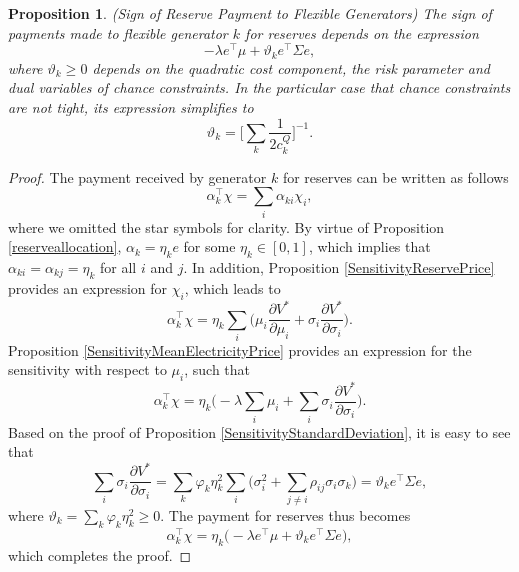 \documentclass{article}
\newtheorem{proposition}{Proposition}
\begin{document}
\begin{proposition}
(Sign of Reserve Payment to Flexible Generators) The sign of payments made to flexible generator $k$ for reserves depends on the expression
\begin{equation*}
-\lambda e^\top \mu + \vartheta_k e^\top \Sigma e,
\end{equation*}
where $\vartheta_k \ge 0$ depends on the quadratic cost component, the risk parameter and dual variables of chance constraints. In the particular case that chance constraints are not tight, its expression simplifies to
\begin{equation*}
\vartheta_k = \bigg[\sum_k \frac{1}{2 c_k^Q} \bigg]^{-1}.
\end{equation*} 
\end{proposition}
\begin{proof}
The payment received by generator $k$ for reserves can be written as follows
\begin{equation*}
\alpha_k^\top \chi = \sum_i \alpha_{ki} \chi_i,
\end{equation*}
where we omitted the star symbols for clarity. By virtue of Proposition \ref{reserveallocation}, $\alpha_k = \eta_k e$ for some $\eta_k \in [0, 1]$, which implies that $\alpha_{ki} = \alpha_{kj} = \eta_k$ for all $i$ and $j$. In addition, Proposition \ref{SensitivityReservePrice} provides an expression for $\chi_i$, which leads to
\begin{equation*}
\alpha_k^\top \chi = \eta_k \sum_i \bigg(\mu_i \frac{\partial V^*}{\partial \mu_i} + \sigma_i \frac{\partial V^*}{\partial \sigma_i}\bigg).
\end{equation*}
Proposition \ref{SensitivityMeanElectricityPrice} provides an expression for the sensitivity with respect to $\mu_i$, such that
\begin{equation*}
\alpha_k^\top \chi = \eta_k \bigg(-\lambda \sum_i \mu_i + \sum_i \sigma_i \frac{\partial V^*}{\partial \sigma_i}\bigg).
\end{equation*}
Based on the proof of Proposition \ref{SensitivityStandardDeviation}, it is easy to see that
\begin{equation*}
\sum_i \sigma_i \frac{\partial V^*}{\partial \sigma_i} = \sum_k \varphi_k \eta_k^2 \sum_i\Big(\sigma_i^2 + \sum_{j \ne i} \rho_{ij} \sigma_i \sigma_k\Big) = \vartheta_k e^\top \Sigma e,
\end{equation*}
where $\vartheta_k = \sum_k \varphi_k \eta_k^2 \ge 0$. The payment for reserves thus becomes
\begin{equation*}
\alpha_k^\top \chi = \eta_k \Big(-\lambda e^\top \mu + \vartheta_k e^\top \Sigma e\Big),
\end{equation*}
which completes the proof.
\end{proof}
\end{document}
